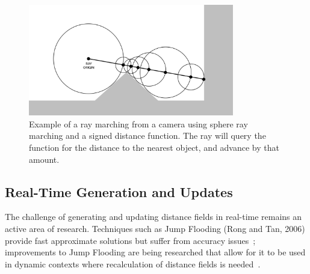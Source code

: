 \begin{figure}[thp]
    \begin{center}
        \includegraphics[width=0.8\textwidth]{figures/ray_marching.png}
    \end{center}
    \caption{Example of a ray marching from a camera using sphere ray marching and a signed distance function. The ray
    will query the function for the distance to the nearest object, and advance by that amount.}
\end{figure}

\subsection{Real-Time Generation and Updates}
The challenge of generating and updating distance fields in real-time remains an active area of research. Techniques
such as Jump Flooding (Rong and Tan, 2006) provide fast approximate solutions but suffer from accuracy
issues~\cite{rong2006jump,rong2007variants}; improvements to Jump Flooding are being researched that allow for it to
be used in dynamic contexts where recalculation of distance fields is needed~\cite{stevenson2022gpu}.
